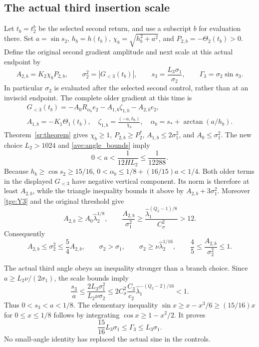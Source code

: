 \subsection{The actual third insertion scale}

Let $t_b=t_2^b$ be the selected second return, and use a subscript
$b$ for evaluation there. Set $a=\sin s_2$, $h_b=h(t_b)$,
$\chi_b=\sqrt{h_b^2+a^2}$, and $P_{2,b}=-\Theta_2(t_b)>0$.
Define the original second gradient amplitude and next scale at this
actual endpoint by
\begin{equation}\label{tge:birthscale}
 A_{2,b}=K_2\chi_bP_{2,b},\qquad
 \sigma_2^2=|G_{<3}(t_b)|,\qquad
 s_3=\frac{L_3\sigma_1}{\sigma_2},\qquad
 \Gamma_3=\sigma_2\sin s_3.
\end{equation}
In particular $\sigma_2$ is evaluated after the selected second
control, rather than at an inviscid endpoint.
The complete older gradient at this time is
\begin{gather*}
 G_{<3}(t_b)=-A_0R_{\alpha_b}e_2
              -A_{1,b}\zeta_{1,b}-A_{2,b}e_2,\\
 A_{1,b}=-K_1\Theta_1(t_b),\quad
 \zeta_{1,b}=\frac{(-a,h_b)}{\chi_b},\quad
 \alpha_b=s_*+\arctan(a/h_b).
\end{gather*}
Theorem~\ref{sr:theorem} gives
$\chi_b\geq1$, $P_{2,b}\geq P_2^*$,
$A_{1,b}\leq2\sigma_1^2$, and $A_0\leq\sigma_1^2$.
The new choice $L_2>1024$ and \eqref{ave:angle_bounds} imply
\begin{equation}\label{tge:a_small}
 0<a<\frac1{12HL_2}\leq\frac1{12288}.
\end{equation}
Because $h_b\geq\cos s_2\geq15/16$,
$0<\alpha_b\leq1/8+(16/15)a<1/4$.
Both older terms in the displayed $G_{<3}$ have negative vertical
component. Its norm is therefore at least $A_{2,b}$, while the
triangle inequality bounds it above by $A_{2,b}+3\sigma_1^2$.
Moreover \eqref{tge:Y3} and the original threshold give
\[
 A_{2,b}\geq A_0\widehat\lambda_2^{1/8},\qquad
 \frac{A_{2,b}}{\sigma_1^2}
 \geq\frac{\widehat\lambda_1^{(Q_2-1)/8}}{C_\sigma^2}>12.
\]
Consequently
\begin{equation}\label{tge:scale_bounds}
 A_{2,b}\leq\sigma_2^2\leq\frac54A_{2,b},\qquad
 \sigma_2>\sigma_1,\qquad
 \sigma_2\geq\nu\widehat\lambda_2^{1/16},\qquad
 \frac45\leq\frac{A_{2,b}}{\sigma_2^2}\leq1.
\end{equation}

The actual third angle obeys an inequality stronger than a branch
choice. Since $a\geq L_2\nu/(2\sigma_1)$, the scale bounds imply
\[
 \frac{s_3}{a}
 \leq\frac{2L_3\sigma_1^2}{L_2\nu\sigma_2}
 \leq2C_\sigma^2\frac{C_3}{c_2}
             \widehat\lambda_1^{-(Q_2-2)/16}<1.
\]
Thus $0<s_3<a<1/8$. The elementary inequality
$\sin x\geq x-x^3/6\geq(15/16)x$ for $0\leq x\leq1/8$
follows by integrating $\cos x\geq1-x^2/2$.
It proves
\begin{equation}\label{tge:rate_scale}
 \frac{15}{16}L_3\sigma_1\leq\Gamma_3\leq L_3\sigma_1.
\end{equation}
No small-angle identity has replaced the actual sine in the controls.

